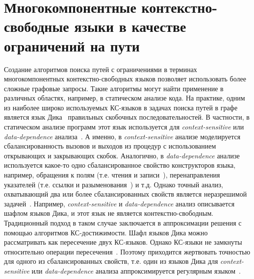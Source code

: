 \section{Многокомпонентные контекстно-свободные языки в качестве ограничений на пути}
	\label{sec:FLPQ_MCFGConstraints}


Создание алгоритмов поиска путей с ограничениями в терминах многокомпонентных контекстно-свободных языков позволяет использовать более сложные графовые запросы. Такие алгоритмы могут найти применение в различных областях, например, в статическом анализе кода. На практике, одним из наиболее широко используемых КС-языков в задачах поиска путей в графе является язык Дика~ правильных скобочных последовательностей. В частности, в статическом анализе программ этот язык используется для \textit{context-sensitive} или \textit{data-dependence} анализа~. А именно,  в \textit{context-sensitive} анализе моделируется сбалансированность вызовов и выходов из процедур с использованием открывающих и закрывающих скобок. Аналогично, в \textit{data-dependence} анализе используется какое-то одно сбалансированное свойство конструкторов языка, например, обращения к полям (т.е. чтения и записи~), перенаправления указателей (т.е. ссылки и разыменования~) и т.д. Однако точный анализ, охватывающий два или более сбалансированных свойств является неразрешимой задачей~. Например,  \textit{context-sensitive} и \textit{data-dependence} анализ описывается шафлом языков Дика, и этот язык не является контекстно-свободным. Традиционный подход в таком случае заключается в аппроксимации решения с помощью алгоритмов КС-достижимости. Шафл языков Дика можно рассматривать как пересечение двух КС-языков. Однако КС-языки не замкнуты относительно операции пересечения~. Поэтому приходится жертвовать точностью для одного из сбалансированных свойств, т.е. один из языков Дика для \textit{context-sensitive} или \textit{data-dependence} анализа аппроксимируется регулярным языком~.

